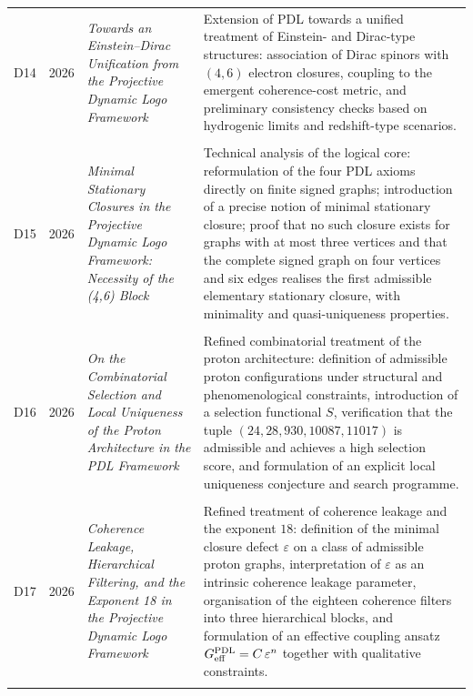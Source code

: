 \documentclass[11pt,a4paper]{article}
\newcommand{\PDL}{\textnormal{PDL}}
\begin{document}
\begin{longtable}{@{}llL{4cm}p{9.0cm}@{}}
D14 & 2026 & \textit{Towards an Einstein--Dirac Unification from the Projective Dynamic Logo Framework} &
Extension of PDL towards a unified treatment of Einstein- and Dirac-type structures: association of Dirac spinors with $(4,6)$ electron closures, coupling to the emergent coherence-cost metric, and preliminary consistency checks based on hydrogenic limits and redshift-type scenarios. \citep{Einstein_Dirac_PDL_2026} \\\\[0.5em]

D15 & 2026 & \textit{Minimal Stationary Closures in the Projective Dynamic Logo Framework: Necessity of the (4,6) Block} &
Technical analysis of the logical core: reformulation of the four PDL axioms directly on finite signed graphs; introduction of a precise notion of minimal stationary closure; proof that no such closure exists for graphs with at most three vertices and that the complete signed graph on four vertices and six edges realises the first admissible elementary stationary closure, with minimality and quasi-uniqueness properties. \citep{Minimal_Stationary_Closures_2026} \\\\[0.5em]

D16 & 2026 & \textit{On the Combinatorial Selection and Local Uniqueness of the Proton Architecture in the PDL Framework} &
Refined combinatorial treatment of the proton architecture: definition of admissible proton configurations under structural and phenomenological constraints, introduction of a selection functional $S$, verification that the tuple $(24,28,930,10087,11017)$ is admissible and achieves a high selection score, and formulation of an explicit local uniqueness conjecture and search programme. \citep{Proton_Local_Uniqueness_2026,Combinatorial_Proton_v2_2026} \\\\[0.5em]

D17 & 2026 & \textit{Coherence Leakage, Hierarchical Filtering, and the Exponent 18 in the Projective Dynamic Logo Framework} &
Refined treatment of coherence leakage and the exponent $18$: definition of the minimal closure defect $\varepsilon$ on a class of admissible proton graphs, interpretation of $\varepsilon$ as an intrinsic coherence leakage parameter, organisation of the eighteen coherence filters into three hierarchical blocks, and formulation of an effective coupling ansatz $G_{\mathrm{eff}}^{\PDL}=C\,\varepsilon^{n}$ together with qualitative constraints. \citep{Coherence_Leakage_18_2026,Topological_Reformulation_PDL_2026,Effective_Fields_PDL_2026} \\\\[0.5em]


\end{longtable}
\end{document}
